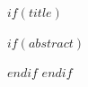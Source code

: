 $if(title)$

\begin{frame}
 \titlepage
\end{frame}

$if(abstract)$
\begin{abstract}
$abstract$
\end{abstract}
$endif$
$endif$